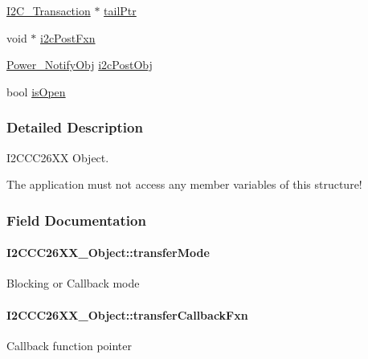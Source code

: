 \begin{DoxyCompactItemize}
\item 
\hyperlink{struct_i2_c___transaction}{I2\+C\+\_\+\+Transaction} $\ast$ \hyperlink{struct_i2_c_c_c26_x_x___object_a6cd1216ab6faa1e951186dfe696f841b}{tail\+Ptr}
\item 
void $\ast$ \hyperlink{struct_i2_c_c_c26_x_x___object_a6a7aaccb2b2b05d9fd9230924acf9e96}{i2c\+Post\+Fxn}
\item 
\hyperlink{struct_power___notify_obj}{Power\+\_\+\+Notify\+Obj} \hyperlink{struct_i2_c_c_c26_x_x___object_a2b16c813ec8f21896de5eecf03ed4178}{i2c\+Post\+Obj}
\item 
bool \hyperlink{struct_i2_c_c_c26_x_x___object_a4c74297d4652d9f61558ca4099867686}{is\+Open}
\end{DoxyCompactItemize}


\subsubsection{Detailed Description}
I2\+C\+C\+C26\+X\+X Object. 

The application must not access any member variables of this structure! 

\subsubsection{Field Documentation}
\paragraph[{transfer\+Mode}]{ I2\+C\+C\+C26\+X\+X\+\_\+\+Object\+::transfer\+Mode}\label{struct_i2_c_c_c26_x_x___object_a64cd64cf328013bebacf75feaa17f127}
Blocking or Callback mode 
\paragraph[{transfer\+Callback\+Fxn}]{ I2\+C\+C\+C26\+X\+X\+\_\+\+Object\+::transfer\+Callback\+Fxn}\label{struct_i2_c_c_c26_x_x___object_ad8faa83bb84c09307294134d9fd9d454}
Callback function pointer 
